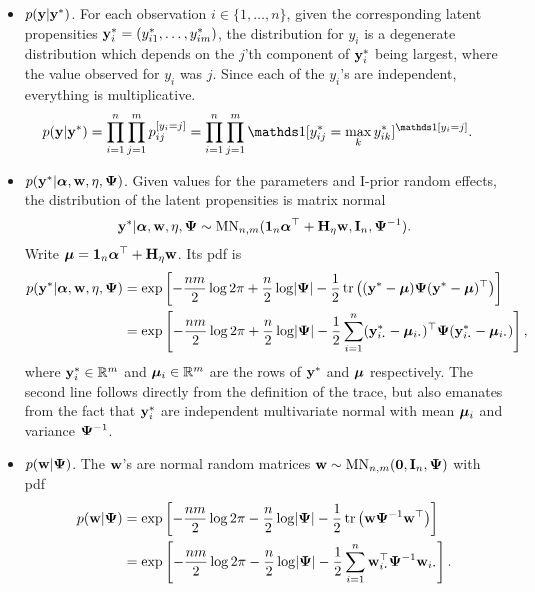 \begin{itemize}
  \item {\boldmath$p({\mathbf y}|{\mathbf y}^*)$}. For each observation $i\in\{1,\dots,n\}$, given the corresponding latent propensities ${\mathbf y}^*_i = (y_{i1}^*,\dots,y_{im}^*)$, the distribution for $y_i$ is a degenerate distribution which depends on the $j$'th component of ${\mathbf y}^*_i$ being largest, where the value observed for $y_i$ was $j$. Since each of the $y_i$'s are independent, everything is multiplicative.
  \begin{align*}
    p(\by|\by^*) 
    &= \prod_{i=1}^n \prod_{j=1}^m p_{ij}^{[y_i = j]} 
    = \prod_{i=1}^n \prod_{j=1}^m \ind[y_{ij}^* 
    = \max_k y_{ik}^*]^{\ind[y_i = j]}.
  \end{align*}
  
  \item {\boldmath$p({\mathbf y}^*|{\bm\alpha},{\mathbf w},\eta,{\bm\Psi})$}. Given values for the parameters and I-prior random effects, the distribution of the latent propensities is matrix normal
  \[
    {\mathbf y}^*|{\bm\alpha},{\mathbf w},\eta,{\bm\Psi} \sim \operatorname{MN}_{n,m}({\mathbf 1}_n{\bm\alpha}^\top + {\mathbf H}_\eta{\mathbf w}, {\mathbf I}_n, {\bm\Psi}^{-1}).
  \]
  Write ${\bm\mu} = {\mathbf 1}_n{\bm\alpha}^\top + {\mathbf H}_\eta{\mathbf w}$.
  Its pdf is
  \begin{align*}
    p(\by^*|\balpha,\bw,\eta,\bPsi)
    &= \exp \left[-\half[nm]\log 2\pi + \half[n]\log\abs{\bPsi} - \half\tr \big((\by^* - \bmu) \bPsi (\by^* - \bmu)^\top  \big)  \right] \\
    &= \exp \left[-\half[nm]\log 2\pi + \half[n]\log\abs{\bPsi} - \half\sum_{i=1}^n (\by^*_{i \bigcdot} - \bmu_{i \bigcdot})^\top \bPsi (\by^*_{i \bigcdot} - \bmu_{i \bigcdot})   \right],
  \end{align*}
  where ${\mathbf y}^*_i \in\mathbb{R}^m$ and ${\bm\mu}_i \in\mathbb{R}^m$ are the rows of ${\mathbf y}^*$ and ${\bm\mu}$ respectively.
  The second line follows directly from the definition of the trace, but  also emanates from the fact that ${\mathbf y}_i^*$ are independent multivariate normal with mean ${\bm\mu}_i$ and variance ${\bm\Psi}^{-1}$.
  
  \item {\boldmath$p({\mathbf w}|{\bm\Psi})$}. The ${\mathbf w}$'s are normal random matrices ${\mathbf w} \sim \operatorname{MN}_{n,m}({\mathbf 0}, {\mathbf I}_n,{\bm\Psi})$ with pdf
  \begin{align*}
    p(\bw|\bPsi) 
    &= \exp \left[-\half[nm]\log 2\pi - \half[n]\log\abs{\bPsi} - \half\tr \big( \bw \bPsi^{-1} \bw^\top \big)  \right] \\
    &= \exp \left[-\half[nm]\log 2\pi - \half[n]\log\abs{\bPsi} - \half\sum_{i=1}^n  \bw_{i \bigcdot}^\top \bPsi^{-1} \bw_{i \bigcdot}   \right].
  \end{align*}
  

\end{itemize}
